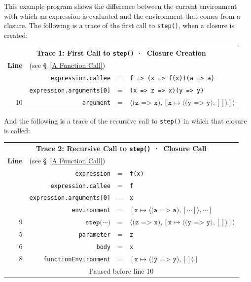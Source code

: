\documentclass[12pt, oneside]{book}
\begin{document}
This example program shows the difference between the current environment with which an expression is evaluated and the environment that comes from a closure. The following is a trace of the first call to \texttt{step()}, when a closure is created:

\begin{center}
\begin{tabular}{rrcl}
\multicolumn{4}{c}{\textbf{Trace 1: First Call to \texttt{step()} · Closure Creation}} \\
\textbf{Line} & \multicolumn{1}{l}{(see §~\ref{A Function Call})} & & \\
& \texttt{expression.callee} & = & \texttt{f => (x => f(x))(a => a)} \\
& \texttt{expression.arguments[0]} & = & \texttt{(x => z => x)(y => y)} \\
\rowcolor[rgb]{.88,1,1} 10 & \texttt{argument} & = & $\langle \texttt{(z => x)}, [\texttt{x} \mapsto \langle \texttt{(y => y)}, [] \rangle] \rangle$ \\
\end{tabular}
\end{center}

And the following is a trace of the recursive call to \texttt{step()} in which that closure is called:

\begin{center}
\begin{tabular}{rrcl}
\multicolumn{4}{c}{\textbf{Trace 2: Recursive Call to \texttt{step()} · Closure Call}} \\
\textbf{Line} & \multicolumn{1}{l}{(see §~\ref{A Function Call})} & & \\
& \texttt{expression} & = & \texttt{f(x)} \\
& \texttt{expression.callee} & = & \texttt{f} \\
\rowcolor[rgb]{.88,1,1} & \texttt{expression.arguments[0]} & = & \texttt{x} \\
\rowcolor[rgb]{.88,1,1} & \texttt{environment} & = & $[\texttt{x} \mapsto \langle \texttt{(a => a)}, [\cdots] \rangle, \cdots]$ \\
9 & $\texttt{step(}\cdots\texttt{)}$ & = & $\langle \texttt{(z => x)}, [\texttt{x} \mapsto \langle \texttt{(y => y)}, [] \rangle] \rangle$ \\
5 & \texttt{parameter} & = & \texttt{z} \\
\rowcolor[rgb]{.88,1,1} 6 & \texttt{body} & = & \texttt{x} \\
\rowcolor[rgb]{.88,1,1} 8 & \texttt{functionEnvironment} & = & $[\texttt{x} \mapsto \langle \texttt{(y => y)}, [] \rangle]$ \\
\multicolumn{4}{c}{Paused before line 10}\\
\end{tabular}
\end{center}
\end{document}
